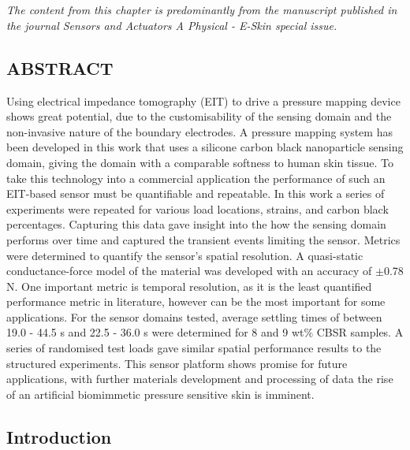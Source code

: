\chapter{\chapvname}
\label{chapter5}

\textit{The content from this chapter is predominantly from the manuscript published in the journal Sensors and Actuators A Physical - E-Skin special issue.}


\section*{ABSTRACT}
Using electrical impedance tomography (EIT) to drive a pressure mapping device shows great potential, due to the customisability of the sensing domain and the non-invasive nature of the boundary electrodes. A pressure mapping system has been developed in this work that uses a silicone carbon black nanoparticle sensing domain, giving the domain with a comparable softness to human skin tissue. To take this technology into a commercial application the performance of such an EIT-based sensor must be quantifiable and repeatable. In this work a series of experiments were repeated for various load locations, strains, and carbon black percentages. Capturing this data gave insight into the how the sensing domain performs over time and captured the transient events limiting the sensor. Metrics were determined to quantify the sensor's spatial resolution. A quasi-static conductance-force model of the material was developed with an accuracy of $\pm$0.78 N. One important metric is temporal resolution, as it is the least quantified performance metric in literature, however can be the most important for some applications. For the sensor domains tested, average settling times of between 19.0 - 44.5 s and 22.5 - 36.0 s were determined for 8 and 9 wt\% CBSR samples. A series of randomised test loads gave similar spatial performance results to the structured experiments. This sensor platform shows promise for future applications, with further materials development and processing of data the rise of an artificial biomimmetic pressure sensitive skin is imminent.


\section{Introduction} \label{sec:introduction}

